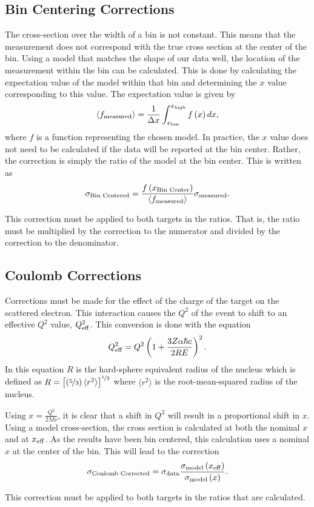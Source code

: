 \subsection{Bin Centering Corrections}

The cross-section over the width of a bin is not constant. This means that the measurement does not correspond with the true cross section at the center of the bin. Using a model that matches the shape of our data well, the location of the measurement within the bin can be calculated. This is done by calculating the expectation value of the model within that bin and determining the $x$ value corresponding to this value. The expectation value is given by
\begin{equation}
	\langle f_{\rm measured}\rangle = \frac{1}{\Delta x}\int_{x_{\rm low}}^{x_{\rm high}} f\left( x \right) dx,
\end{equation}
where $f$ is a function representing the chosen model. In practice, the $x$ value does not need to be calculated if the data will be reported at the bin center. Rather, the correction is simply the ratio of the model at the bin center. This is written as
\begin{equation}
	\sigma_{\textrm{Bin Centered}} = \frac{f\left(x_{\textrm{Bin Center}}\right)}{\langle f_{\rm measured}\rangle} \sigma_{\rm measured}.
\end{equation}

This correction must be applied to both targets in the ratios. That is, the ratio must be multiplied by the correction to the numerator and divided by the correction to the denominator.\cite{wtsydp}

\subsection{Coulomb Corrections}

Corrections must be made for the effect of the charge of the target on the scattered electron. This interaction causes the $Q^2$ of the event to shift to an effective $Q^2$ value, $Q^2_{\rm eff}$. This conversion is done with the equation
\begin{equation}
	Q^2_{\rm eff} = Q^2 \left(1 + \frac{3Z\alpha\hbar c}{2RE}\right)^{2}.
\end{equation}
In this equation $R$ is the hard-sphere equivalent radius of the nucleus which is defined as $R=\left[\left(\nicefrac{5}{3}\right) \langle r^{2}\rangle\right]^{\nicefrac{1}{2}}$ where $\langle r^2\rangle$ is the root-mean-squared radius of the nucleus.\cite{coulomb}

Using $x=\frac{Q^2}{2M\nu}$, it is clear that a shift in $Q^2$ will result in a proportional shift in $x$. Using a model cross-section, the cross section is calculated at both the nominal $x$ and at $x_{\rm eff}$. As the results have been bin centered, this calculation uses a nominal $x$ at the center of the bin. This will lead to the correction
\begin{equation}
	\sigma_{\textrm{Coulomb Corrected}} = \sigma_{\rm data} \frac{\sigma_{\rm model}\left(x_{\rm eff}\right)}{\sigma_{\rm model}\left(x\right)}.
\end{equation}

This correction must be applied to both targets in the ratios that are calculated.